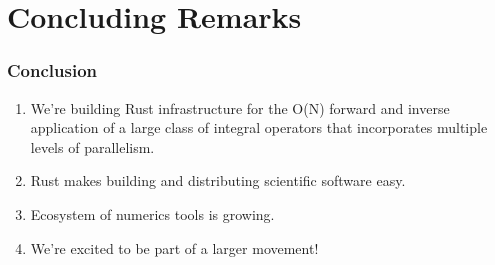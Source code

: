 \section{Concluding Remarks}

\begin{frame}
    \frametitle{Conclusion}

    \begin{enumerate}
        \item We're building Rust infrastructure for the O(N) forward and inverse application of a large class of integral operators that incorporates multiple levels of parallelism.
        \item Rust makes building and distributing scientific software easy.
        \item Ecosystem of numerics tools is growing.
        \item We're excited to be part of a larger movement!
    \end{enumerate}
\end{frame}